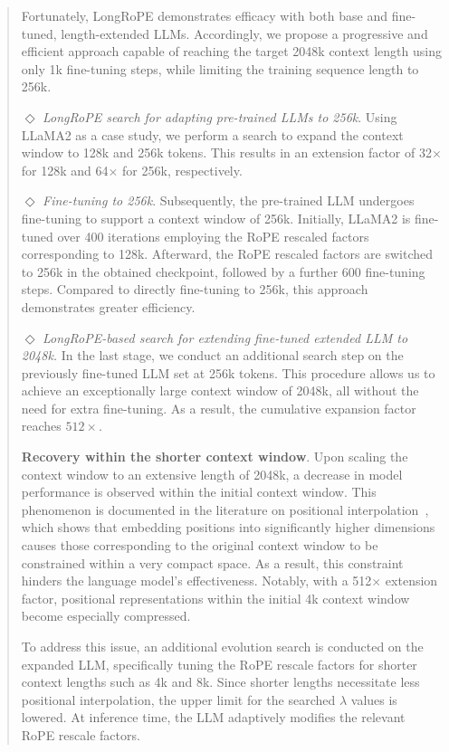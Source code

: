 \begin{abstract}
Fortunately, LongRoPE demonstrates efficacy with both base and fine-tuned, length-extended LLMs. Accordingly, we propose a progressive and efficient approach capable of reaching the target 2048k context length using only 1k fine-tuning steps, while limiting the training sequence length to 256k.

$\Diamond$ \textit{LongRoPE search for adapting pre-trained LLMs to 256k}. Using LLaMA2 as a case study, we perform a search to expand the context window to 128k and 256k tokens. This results in an extension factor of 32$\times$ for 128k and 64$\times$ for 256k, respectively.

$\Diamond$ \textit{Fine-tuning to 256k}. Subsequently, the pre-trained LLM undergoes fine-tuning to support a context window of 256k. Initially, LLaMA2 is fine-tuned over 400 iterations employing the RoPE rescaled factors corresponding to 128k. Afterward, the RoPE rescaled factors are switched to 256k in the obtained checkpoint, followed by a further 600 fine-tuning steps. Compared to directly fine-tuning to 256k, this approach demonstrates greater efficiency.

$\Diamond$ \textit{LongRoPE-based search for extending fine-tuned extended LLM to 2048k.} In the last stage, we conduct an additional search step on the previously fine-tuned LLM set at 256k tokens. This procedure allows us to achieve an exceptionally large context window of 2048k, all without the need for extra fine-tuning. As a result, the cumulative expansion factor reaches $512\times$.

\textbf{Recovery within the shorter context window}. Upon scaling the context window to an extensive length of 2048k, a decrease in model performance is observed within the initial context window. This phenomenon is documented in the literature on positional interpolation~\cite{pi}, which shows that embedding positions into significantly higher dimensions causes those corresponding to the original context window to be constrained within a very compact space. As a result, this constraint hinders the language model's effectiveness. Notably, with a 512$\times$ extension factor, positional representations within the initial 4k context window become especially compressed.

To address this issue, an additional evolution search is conducted on the expanded LLM, specifically tuning the RoPE rescale factors for shorter context lengths such as 4k and 8k. Since shorter lengths necessitate less positional interpolation, the upper limit for the searched $\lambda$ values is lowered. At inference time, the LLM adaptively modifies the relevant RoPE rescale factors.


\end{abstract}
